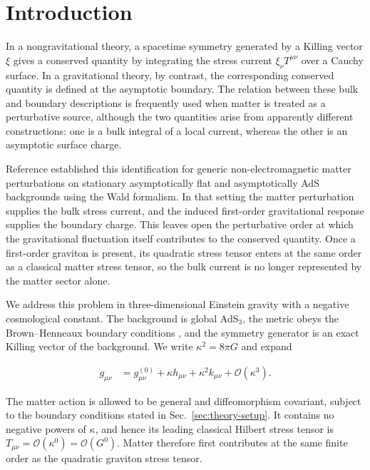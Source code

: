 \section{Introduction}\label{sec:introduction}

In a nongravitational theory, a spacetime symmetry generated by a Killing vector $\xi$ gives a conserved quantity by integrating the stress current $\xi _{\nu}T^{\mu \nu}$ over a Cauchy surface. In a gravitational theory, by contrast, the corresponding conserved quantity is defined at the asymptotic boundary. The relation between these bulk and boundary descriptions is frequently used when matter is treated as a perturbative source, although the two quantities arise from apparently different constructions: one is a bulk integral of a local current, whereas the other is an asymptotic surface charge.

Reference \cite{Chen:2026bulkboundary} established this identification for generic non-electromagnetic matter perturbations on stationary asymptotically flat and asymptotically AdS backgrounds using the Wald formalism. In that setting the matter perturbation supplies the bulk stress current, and the induced first-order gravitational response supplies the boundary charge. This leaves open the perturbative order at which the gravitational fluctuation itself contributes to the conserved quantity. Once a first-order graviton is present, its quadratic stress tensor enters at the same order as a classical matter stress tensor, so the bulk current is no longer represented by the matter sector alone.

We address this problem in three-dimensional Einstein gravity with a negative cosmological constant. The background is global AdS$_3$, the metric obeys the Brown--Henneaux boundary conditions \cite{Brown:1986nw}, and the symmetry generator is an exact Killing vector of the background. We write $\kappa ^2=8\pi G$ and expand

\begin{align}
g_{\mu\nu} & =g^{(0)}_{\mu\nu}+\kappa h_{\mu\nu}+\kappa ^2k_{\mu\nu}+\mathcal{O}(\kappa ^3).
\end{align}

The matter action is allowed to be general and diffeomorphism covariant, subject to the boundary conditions stated in Sec.~\ref{sec:theory-setup}. It contains no negative powers of $\kappa$, and hence its leading classical Hilbert stress tensor is $T_{\mu\nu}=\mathcal{O}(\kappa ^0)=\mathcal{O}(G^0)$. Matter therefore first contributes at the same finite order as the quadratic graviton stress tensor.

